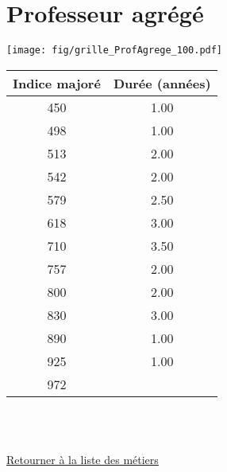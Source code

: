 \newpage 
 
\chapter{Professeur agrégé} 

\begin{minipage}{0.55\linewidth}\texttt{[image: fig/grille\_ProfAgrege\_100.pdf]}\end{minipage} 
\begin{minipage}{0.3\linewidth} 
 \begin{center} 

\begin{tabular}[htb]{|c|c|} 
\hline 
 Indice majoré &  Durée (années) \\ 
\hline \hline 
 450 &  1.00 \\ 
\hline 
 498 &  1.00 \\ 
\hline 
 513 &  2.00 \\ 
\hline 
 542 &  2.00 \\ 
\hline 
 579 &  2.50 \\ 
\hline 
 618 &  3.00 \\ 
\hline 
 710 &  3.50 \\ 
\hline 
 757 &  2.00 \\ 
\hline 
 800 &  2.00 \\ 
\hline 
 830 &  3.00 \\ 
\hline 
 890 &  1.00 \\ 
\hline 
 925 &  1.00 \\ 
\hline 
 972 &   \\ 
\hline 
\hline 
\end{tabular} 
\end{center} 
 \end{minipage} 

~\\ 
 


   
 \localtableofcontents 

~\\ 
 
 \hyperlink{page.2}{\noindent Retourner à la liste des métiers}

 \newpage 

